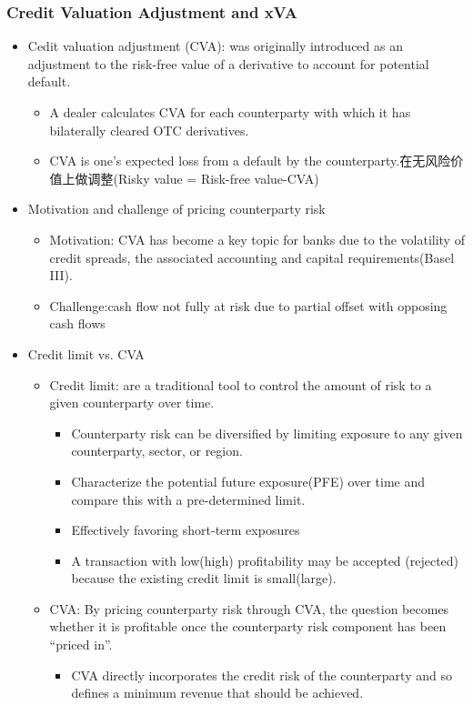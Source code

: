 \subsubsection{Credit Valuation Adjustment and xVA}
\begin{itemize}
    \item Cedit valuation adjustment (CVA): was originally introduced as an adjustment to the risk-free value of a derivative to account for potential default.
    \begin{itemize}
    \item A dealer calculates CVA for each counterparty with which it has bilaterally cleared OTC derivatives.
    \item CVA is one’s expected loss from a default by the counterparty.在无风险价值上做调整(Risky value = Risk-free value-CVA)
    \end{itemize}
\item Motivation and challenge of pricing counterparty risk
\begin{itemize}
    \item Motivation: CVA has become a key topic for banks due to the volatility of credit spreads, the associated accounting and capital requirements(Basel III).
    \item Challenge:cash flow not fully at risk due to partial offset with opposing cash flows
\end{itemize}

\item Credit limit vs. CVA
\begin{itemize}
    \item Credit limit: are a traditional tool to control
    the amount of risk to a given counterparty over time.
\begin{itemize}
    \item Counterparty risk can be diversified by limiting exposure to any given counterparty, sector, or region.
    \item Characterize the potential future exposure(PFE) over time and compare this with a pre-determined limit.
    \item Effectively favoring short-term exposures
    \item A transaction with low(high) profitability may be accepted (rejected) because the existing credit limit is small(large).
\end{itemize}

    \item CVA: By pricing counterparty risk through CVA, the question becomes whether it is profitable once the counterparty risk component has been “priced in”.
    \begin{itemize}
        \item CVA directly incorporates the credit risk of the
    counterparty and so defines a minimum revenue that
    should be achieved.
    \end{itemize}
    

\end{itemize}
\end{itemize}
